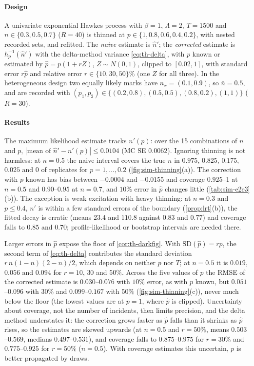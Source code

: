 \paragraph{Design} A univariate exponential Hawkes process with $\beta=1$, $\Lambda=2$,
$T=1500$ and $n\in\{0.3,0.5,0.7\}$ ($R=40$) is thinned at $p\in\{1,0.8,0.6,0.4,0.2\}$, with
nested recorded sets, and refitted. The \emph{naive} estimate is $\hat n'$; the
\emph{corrected} estimate is $h_p^{-1}(\hat n')$ with the delta-method variance
\eqref{eq:th-delta}, with $p$ known or estimated by $\hat p=p(1+rZ)$, $Z\sim N(0,1)$,
clipped to $[0.02,1]$, with standard error $r\hat p$ and relative error
$r\in\{10,30,50\}\%$ (one $Z$ for all three). In the heterogeneous design two equally likely
marks have $n_x=(0.1,0.9)$, so $\bar n=0.5$, and are recorded with
$(p_1,p_2)\in\{(0.2,0.8),(0.5,0.5),(0.8,0.2),(1,1)\}$ ($R=30$).

\paragraph{Results} The maximum likelihood estimate tracks $n'(p)$: over the 15
combinations of $n$ and $p$, $|\text{mean of }\hat n'-n'(p)|\le0.0104$ (MC SE $0.0062$).
Ignoring thinning is not harmless: at $n=0.5$ the naive interval covers the true $n$ in
$0.975$, $0.825$, $0.175$, $0.025$ and $0$ of replicates for $p=1,\dots,0.2$
(\cref{fig:sim-thinning}(a)). The correction with $p$ known has bias between $-0.0004$ and
$-0.0155$ and coverage $0.925$--$1$ at $n=0.5$ and $0.90$--$0.95$ at $n=0.7$, and $10\%$
error in $\hat p$ changes little (\cref{tab:sim-e2e3}(b)). The exception is weak excitation
with heavy thinning: at $n=0.3$ and $p\le0.4$, $n'$ is within a few standard errors of the
boundary (\cref{prop:lrt}(b)), the fitted decay is erratic (means $23.4$ and $110.8$ against
$0.83$ and $0.77$) and coverage falls to $0.85$ and $0.70$; profile-likelihood or bootstrap
intervals are needed there.

Larger errors in $\hat p$ expose the floor of \cref{cor:th-darkfig}. With
$\mathrm{SD}(\hat p)=rp$, the second term of \eqref{eq:th-delta} contributes the standard
deviation $r\,n(1-n)(2-n)/2$, which depends on neither $p$ nor $T$; at $n=0.5$ it is $0.019$,
$0.056$ and $0.094$ for $r=10$, $30$ and $50\%$. Across the five values of $p$ the RMSE of
the corrected estimate is $0.030$--$0.076$ with $10\%$ error, as with $p$ known, but
$0.051$--$0.096$ with $30\%$ and $0.099$--$0.167$ with $50\%$ (\cref{fig:sim-thinning}(c)),
never much below the floor (the lowest values are at $p=1$, where $\hat p$ is clipped).
Uncertainty about coverage, not the number of incidents, then limits precision, and the
delta method understates it: the correction grows faster as $\hat p$ falls than it shrinks
as $\hat p$ rises, so the estimates are skewed upwards (at $n=0.5$ and $r=50\%$, means $0.503$--$0.569$, medians $0.497$--$0.531$), and
coverage falls to $0.875$--$0.975$ for $r=30\%$ and $0.775$--$0.925$ for $r=50\%$ ($n=0.5$).
With coverage estimates this uncertain, $p$ is better propagated by draws.

